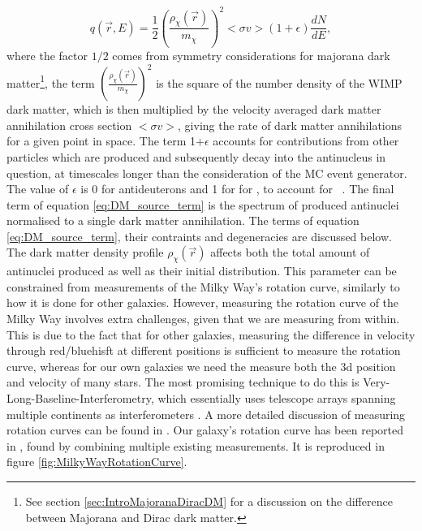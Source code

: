 \begin{equation}\label{eq:DM_source_term}
    q(\vec{r}, E) = \frac{1}{2} \left( \frac{\rho_{\chi}(\vec{r})}{m_\chi}\right)^2 <\sigma v > (1+\epsilon) \frac{dN}{dE},
\end{equation}
where the factor $1/2$ comes from symmetry considerations for majorana dark matter\footnote{See section \ref{sec:IntroMajoranaDiracDM} for a discussion on the difference between Majorana and Dirac dark matter.}, the term $\left( \frac{\rho_{\chi}(\vec{r})}{m_\chi}\right)^2$ is the square of the number density of the WIMP dark matter, which is then multiplied by the velocity averaged dark matter annihilation cross section $<\sigma v>$, giving the rate of dark matter annihilations for a given point in space. The term 1+$\epsilon$ accounts for contributions from other particles which are produced and subsequently decay into the antinucleus in question, at timescales longer than the consideration of the MC event generator. The value of $\epsilon$ is 0 for antideuterons and 1 for for \ahe, to account for \atrit\ . The final term of equation \ref{eq:DM_source_term} is the spectrum of produced antinuclei normalised to a single dark matter annihilation. The terms of equation \ref{eq:DM_source_term}, their contraints and degeneracies are discussed below.\\

The dark matter density profile $\rho_\chi(\vec{r})$ affects both the total amount of antinuclei produced as well as their initial distribution. This parameter can be constrained from measurements of the Milky Way's rotation curve, similarly to how it is done for other galaxies. However, measuring the rotation curve of the Milky Way involves extra challenges, given that we are measuring from within. This is due to the fact that for other galaxies, measuring the difference in velocity through red/bluehisft at different positions is sufficient to measure the rotation curve, whereas for our own galaxies we need the measure both the 3d position and velocity of many stars. The most promising technique to do this is Very-Long-Baseline-Interferometry, which essentially uses telescope arrays spanning multiple continents as interferometers \cite{Charlot_2020}. A more detailed discussion of measuring rotation curves can be found in \cite{Sofue_2016, Sofue2020}. Our galaxy's rotation curve  has been reported in \cite{Sofue2020}, found by combining multiple existing measurements. It is reproduced in figure \ref{fig:MilkyWayRotationCurve}. \\

